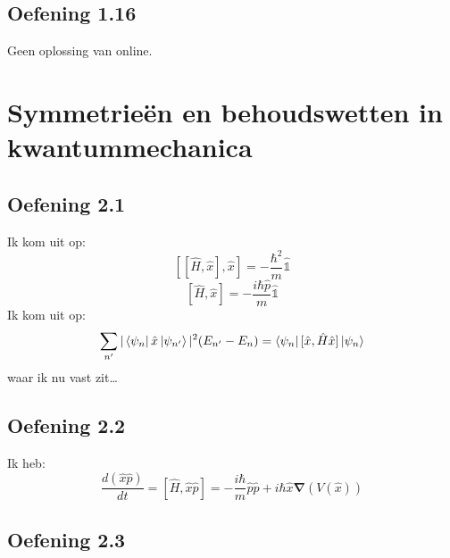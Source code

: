 \documentclass[a4paper,twoside]{article}
\theoremstyle{definition}
\theoremstyle{plain}
\begin{document}
\subsection{Oefening 1.16}
Geen oplossing van online.
\section{Symmetrieën en behoudswetten in kwantummechanica}
\subsection{Oefening 2.1}
Ik kom uit op:
\[
[[\hat H , \hat x], \hat x] = -\frac{\hbar^2}{m} \hat{\mathds{1}}
\]
\[
[\hat H , \hat x] = -\frac{i\hbar \hat p}{m} \hat{\mathds{1}}
\]
Ik kom uit op:
\[
\sum_{n'} |\bra{\psi_{n}}\hat x \ket{\psi_{n'}}|^2 (E_{n'} - E_n) = \bra{\psi_n} [\hat x, \hat H \hat x] \ket{\psi_n}
\]
waar ik nu vast zit\dots
\subsection{Oefening 2.2}
Ik heb:
\[
\frac{d(\hat x \hat p)}{dt} = [\hat H, \hat x \hat p] = -\frac{i \hbar}{m} \hat p \hat p + i \hbar \hat x \bm \nabla (V(\hat x))
\]
\subsection{Oefening 2.3}
\end{document}
